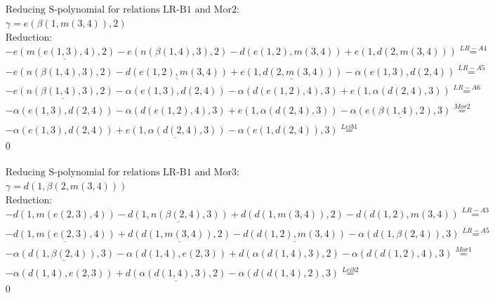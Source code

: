 \documentclass[11pt]{amsart}
\begin{document}
\begin{align*} 
& \text{Reducing S-polynomial for relations LR-B1 and Mor2:} \\ 
& \gamma = e(\beta(1,m(3,4)),2) \\ 
& \text{Reduction}: \\& - \underline{e(m(e(1,3),4),2)} - e(n(\beta(1,4),3),2) - d(e(1,2),m(3,4)) + e(1,d(2,m(3,4))) \stackrel{ LR-A4 }{=}  \\ 
& - e(n(\beta(1,4),3),2) - \underline{d(e(1,2),m(3,4))} + \underline{e(1,d(2,m(3,4)))} - \alpha(e(1,3),d(2,4)) \stackrel{ LR-A5 }{=}  \\ 
& - \underline{e(n(\beta(1,4),3),2)} - \alpha(e(1,3),d(2,4)) - \alpha(d(e(1,2),4),3) + e(1,\alpha(d(2,4),3)) \stackrel{ LR-A6 }{=}  \\ 
& - \alpha(e(1,3),d(2,4)) - \alpha(d(e(1,2),4),3) + e(1,\alpha(d(2,4),3)) - \underline{\alpha(e(\beta(1,4),2),3)} \stackrel{ Mor2 }{=}  \\ 
& - \alpha(e(1,3),d(2,4)) + \underline{e(1,\alpha(d(2,4),3))} - \alpha(e(1,d(2,4)),3) \stackrel{ Leib1 }{=}  \\ 
&0\\ 
\end{align*} 
 
\begin{align*} 
& \text{Reducing S-polynomial for relations LR-B1 and Mor3:} \\ 
& \gamma = d(1,\beta(2,m(3,4))) \\ 
& \text{Reduction}: \\& - d(1,m(e(2,3),4)) - \underline{d(1,n(\beta(2,4),3))} + d(d(1,m(3,4)),2) - d(d(1,2),m(3,4)) \stackrel{ LR-A3 }{=}  \\ 
& - \underline{d(1,m(e(2,3),4))} + \underline{d(d(1,m(3,4)),2)} - \underline{d(d(1,2),m(3,4))} - \alpha(d(1,\beta(2,4)),3) \stackrel{ LR-A5 }{=}  \\ 
& - \underline{\alpha(d(1,\beta(2,4)),3)} - \alpha(d(1,4),e(2,3)) + d(\alpha(d(1,4),3),2) - \alpha(d(d(1,2),4),3) \stackrel{ Mor1 }{=}  \\ 
& - \alpha(d(1,4),e(2,3)) + \underline{d(\alpha(d(1,4),3),2)} - \alpha(d(d(1,4),2),3) \stackrel{ Leib2 }{=}  \\ 
&0\\ 
\end{align*} 
 
\end{document}

